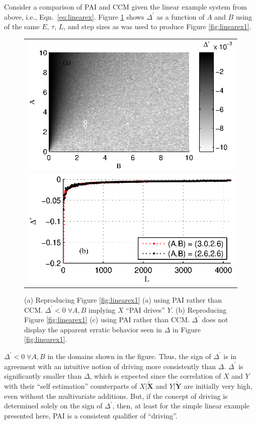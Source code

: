 \documentclass[twocolumn,aps,pre,groupedaddress]{revtex4-1}
\begin{document}
Consider a comparison of PAI and CCM given the linear example system from above, i.e., Eqn.\ \ref{eq:linearex}.  Figure \ref{fig:linearExPAI} shows $\Delta^\prime$ as a function of $A$ and $B$ using of the same $E$, $\tau$, $L$, and step sizes as was used to produce Figure \ref{fig:linearex1}.
\begin{figure}[ht]
\begin{tabular}{c}
\includegraphics[scale=0.8]{LinearExPAI.eps} \\
\includegraphics[scale=0.8]{LinearExPAIChangeL.eps} \\
\end{tabular}
\caption{(a) Reproducing Figure \ref{fig:linearex1} (a) using PAI rather than CCM.  $\Delta^\prime<0\;\forall A,B$ implying $X$ ``PAI drives'' $Y$. (b) Reproducing Figure \ref{fig:linearex1} (c) using PAI rather than CCM.  $\Delta^\prime$ does not display the apparent erratic behavior seen in $\Delta$ in Figure \ref{fig:linearex1}.}
\label{fig:linearExPAI}
\end{figure}
$\Delta^\prime<0\;\forall A,B$ in the domains shown in the figure.  Thus, the sign of $\Delta^\prime$ is in agreement with an intuitive notion of driving more consistently than $\Delta$.  $\Delta^\prime$ is significantly smaller than $\Delta$, which is expected since the correlation of $X$ and $Y$ with their ``self estimation'' counterparts of $X|\tilde{\mathbf{X}}$ and $Y|\tilde{\mathbf{Y}}$ are initially very high, even without the multivariate additions.  But, if the concept of driving is determined solely on the sign of $\Delta^\prime$, then, at least for the simple linear example presented here, PAI is a consistent qualifier of ``driving''.
\end{document}
